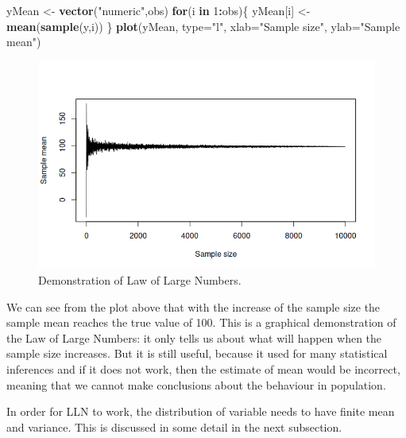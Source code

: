 \documentclass[
]{book}
\newenvironment{Shaded}{\begin{snugshade}}{\end{snugshade}}
\newcommand{\AttributeTok}[1]{\textcolor[rgb]{0.13,0.29,0.53}{#1}}
\newcommand{\ControlFlowTok}[1]{\textcolor[rgb]{0.13,0.29,0.53}{\textbf{#1}}}
\newcommand{\DecValTok}[1]{\textcolor[rgb]{0.00,0.00,0.81}{#1}}
\newcommand{\FunctionTok}[1]{\textcolor[rgb]{0.13,0.29,0.53}{\textbf{#1}}}
\newcommand{\NormalTok}[1]{#1}
\newcommand{\OtherTok}[1]{\textcolor[rgb]{0.56,0.35,0.01}{#1}}
\newcommand{\SpecialCharTok}[1]{\textcolor[rgb]{0.81,0.36,0.00}{\textbf{#1}}}
\newcommand{\StringTok}[1]{\textcolor[rgb]{0.31,0.60,0.02}{#1}}
\theoremstyle{definition}
\theoremstyle{definition}
\theoremstyle{definition}
\theoremstyle{definition}
\theoremstyle{remark}
\begin{document}
\begin{Shaded}
\begin{Highlighting}[]
\NormalTok{yMean }\OtherTok{\textless{}{-}} \FunctionTok{vector}\NormalTok{(}\StringTok{"numeric"}\NormalTok{,obs)}
\ControlFlowTok{for}\NormalTok{(i }\ControlFlowTok{in} \DecValTok{1}\SpecialCharTok{:}\NormalTok{obs)\{}
\NormalTok{    yMean[i] }\OtherTok{\textless{}{-}} \FunctionTok{mean}\NormalTok{(}\FunctionTok{sample}\NormalTok{(y,i))}
\NormalTok{\}}
\FunctionTok{plot}\NormalTok{(yMean, }\AttributeTok{type=}\StringTok{"l"}\NormalTok{, }\AttributeTok{xlab=}\StringTok{"Sample size"}\NormalTok{, }\AttributeTok{ylab=}\StringTok{"Sample mean"}\NormalTok{)}
\end{Highlighting}
\end{Shaded}

\begin{figure}
\centering
\includegraphics{images/02-statistics-LLN.png}
\caption{\label{fig:statsSampleMean}Demonstration of Law of Large Numbers.}
\end{figure}

We can see from the plot above that with the increase of the sample size the sample mean reaches the true value of 100. This is a graphical demonstration of the Law of Large Numbers: it only tells us about what will happen when the sample size increases. But it is still useful, because it used for many statistical inferences and if it does not work, then the estimate of mean would be incorrect, meaning that we cannot make conclusions about the behaviour in population.

In order for LLN to work, the distribution of variable needs to have finite mean and variance. This is discussed in some detail in the next subsection.
\end{document}
